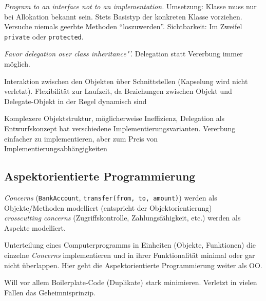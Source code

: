 \documentclass[a4paper,fontsize=9pt, DIV=calc]{scrartcl}
\begin{document}
\begin{multicols}{2}
\begin{description}[leftmargin=*]\itemsep-2mm
\item[Interface/Klasse] \textit{Program to an interface not to an implementation.} Umsetzung: Klasse muss nur bei Allokation bekannt sein. Stets Basistyp der konkreten Klasse vorziehen. Versuche niemals geerbte Methoden "`loszuwerden"'. Sichtbarkeit: Im Zweifel \texttt{private} oder \texttt{protected}.
\item[Delegation] \textit{Favor delegation over class inheritance"'.} Delegation statt Vererbung immer möglich.
\begin{description}[leftmargin=*]\itemsep-2mm
\item[Pro] Interaktion zwischen den Objekten über Schnittstellen (Kapselung wird nicht verletzt). Flexibilität zur Laufzeit, da Beziehungen zwischen Objekt und Delegate-Objekt in der Regel dynamisch sind
\item[Contra] Komplexere Objektstruktur, möglicherweise Ineffizienz, Delegation als Entwurfskonzept hat verschiedene Implementierungsvarianten. Vererbung einfacher zu implementieren, aber zum Preis von Implementierungsabhängigkeiten
\end{description}
\end{description}

\subsection[Aspektorientierte Programmierung]{\textcolor{siemensgreen}{Aspektorientierte Programmierung}}
\textit{Concerns} (\texttt{BankAccount}, \texttt{transfer(from, to, amount)}) werden als Objekte/Methoden modelliert (entspricht der Objektorientierung)\\ \textit{crosscutting concerns} (Zugriffskontrolle, Zahlungsfähigkeit, etc.) werden als Aspekte modelliert.

\begin{description}[leftmargin=*]
    \item[Separation of Concerns ] Unterteilung eines Computerprogramms in Einheiten (Objekte, Funktionen) die einzelne \textit{Concerns} implementieren und in ihrer Funktionalität minimal oder gar nicht überlappen. Hier geht die Aspektorientierte Programmierung weiter als OO. 
		\item[Kritik] Will vor allem Boilerplate-Code (Duplikate) stark minimieren. Verletzt in vielen Fällen das Geheimnisprinzip.
\end{description}


\end{multicols}
\end{document}
